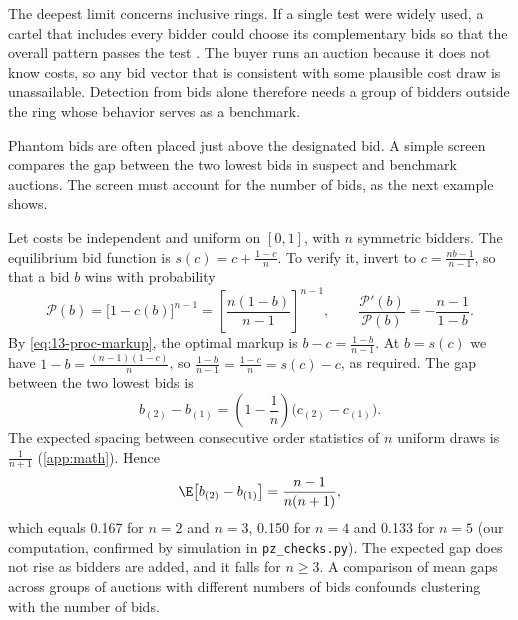 The deepest limit concerns inclusive rings. If a single test were widely used, a cartel that includes every
bidder could choose its complementary bids so that the overall pattern passes the test
\citep[p.~3]{PorterZona1993}. The buyer runs an auction because it does not know costs, so any bid vector that is
consistent with some plausible cost draw is unassailable. Detection from bids alone therefore needs a group of
bidders outside the ring whose behavior serves as a benchmark.

Phantom bids are often placed just above the designated bid. A simple screen compares the gap between the two
lowest bids in suspect and benchmark auctions. The screen must account for the number of bids, as the next example
shows.

\begin{example}\label{ex:13-gap-uniform}
Let costs be independent and uniform on $[0,1]$, with $n$ symmetric bidders. The equilibrium bid function is
$s(c) = c + \frac{1-c}{n}$. To verify it, invert to $c = \frac{nb - 1}{n-1}$, so that a bid $b$ wins with
probability
\begin{equation*}
  \mathcal{P}(b) = \bigl[1 - c(b)\bigr]^{n-1} = \left[\frac{n(1-b)}{n-1}\right]^{n-1},
  \qquad \frac{\mathcal{P}'(b)}{\mathcal{P}(b)} = -\frac{n-1}{1-b} .
\end{equation*}
By \eqref{eq:13-proc-markup}, the optimal markup is $b - c = \frac{1-b}{n-1}$. At $b = s(c)$ we have
$1 - b = \frac{(n-1)(1-c)}{n}$, so $\frac{1-b}{n-1} = \frac{1-c}{n} = s(c) - c$, as required. The gap between the
two lowest bids is
\begin{equation*}
  b_{(2)} - b_{(1)} = \left(1 - \frac{1}{n}\right)\bigl(c_{(2)} - c_{(1)}\bigr) .
\end{equation*}
The expected spacing between consecutive order statistics of $n$ uniform draws is $\frac{1}{n+1}$ (\cref{app:math}).
Hence
\begin{equation*}
  \E\bigl[b_{(2)} - b_{(1)}\bigr] = \frac{n-1}{n(n+1)} ,
\end{equation*}
which equals 0.167 for $n = 2$ and $n = 3$, 0.150 for $n = 4$ and 0.133 for $n = 5$ (our computation, confirmed by
simulation in \texttt{pz\_checks.py}). The expected gap does not rise as bidders are added, and it falls for
$n \ge 3$. A comparison of mean gaps across
groups of auctions with different numbers of bids confounds clustering with the number of bids.
\end{example}

